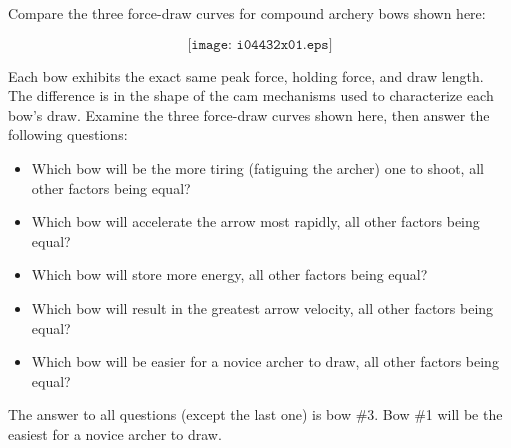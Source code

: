 

Compare the three force-draw curves for compound archery bows shown here:

$$\texttt{[image: i04432x01.eps]}$$

Each bow exhibits the exact same peak force, holding force, and draw length.  The difference is in the shape of the cam mechanisms used to characterize each bow's draw.  Examine the three force-draw curves shown here, then answer the following questions:

\begin{itemize}
\item{} Which bow will be the more tiring (fatiguing the archer) one to shoot, all other factors being equal?
\vskip 10pt 
\item{} Which bow will accelerate the arrow most rapidly, all other factors being equal?
\vskip 10pt 
\item{} Which bow will store more energy, all other factors being equal?
\vskip 10pt 
\item{} Which bow will result in the greatest arrow velocity, all other factors being equal?
\vskip 10pt 
\item{} Which bow will be easier for a novice archer to draw, all other factors being equal?
\end{itemize}







The answer to all questions (except the last one) is bow \#3.  Bow \#1 will be the easiest for a novice archer to draw.











